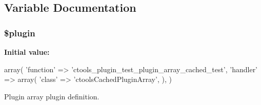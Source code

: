 \subsection{Variable Documentation}
\hypertarget{cached_2plugin__array_8inc_ada8a7130088351710bb02ed622d6bf65}{
\subsubsection[{\$plugin}]{\setlength{\rightskip}{0pt plus 5cm}\$plugin}}
\label{cached_2plugin__array_8inc_ada8a7130088351710bb02ed622d6bf65}
{\bfseries Initial value:}
\begin{DoxyCode}
 array(
  'function' => 'ctools_plugin_test_plugin_array_cached_test',
  'handler' => array(
    'class' => 'ctoolsCachedPluginArray',
  ),
)
\end{DoxyCode}
Plugin array plugin definition. 